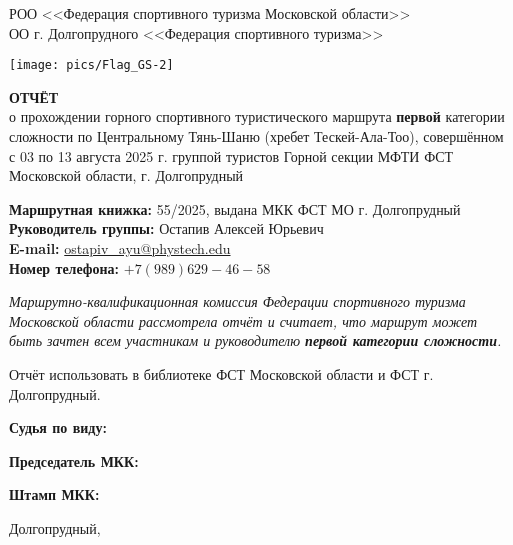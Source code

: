 \begin{titlepage}
\setlength\parindent{0pt}
	\begin{center}
		\large{РОО <<Федерация спортивного туризма Московской области>>\\
		ОО г. Долгопрудного <<Федерация спортивного туризма>>\\}
	\end{center}

	


	
	\begin{center}
		\texttt{[image: pics/Flag\_GS-2]}
		
		\Large{\bfseries{ОТЧЁТ}} \\
		\normalsize о прохождении горного спортивного туристического маршрута \textbf{первой} категории сложности по Центральному Тянь-Шаню (хребет Тескей-Ала-Тоо), совершённом с 03 по 13 августа 2025 г. группой туристов Горной секции МФТИ ФСТ Московской области, г. Долгопрудный
	\end{center}
	\vspace{1.5 cm}
	
	\textbf{Маршрутная книжка:} 55/2025, выдана МКК ФСТ МО г. Долгопрудный \\ 
	\textbf{Руководитель группы:} Остапив Алексей Юрьевич\\
	\textbf{E-mail:} \href{mailto: ostapiv\_ayu@phystech.edu}{ostapiv\_ayu@phystech.edu}\\
	\textbf{Номер телефона:} $+7(989)629-46-58$
	
	\vspace{0.2cm}
	
	\textit{Маршрутно-квалификационная комиссия Федерации спортивного туризма Московской области рассмотрела отчёт и считает, что маршрут может быть зачтен всем участникам и руководителю \textbf{первой категории сложности}.}

	\vspace{0.2cm}
	
	Отчёт использовать в библиотеке ФСТ Московской области и ФСТ г. Долгопрудный.
	
	\vspace{0.8cm}
	\textbf{Судья по виду:} 
	
	
	\vspace{0.8cm}
	\textbf{Председатель МКК:}
	
	\vspace{0.8cm}
	\textbf{Штамп МКК:}
	
	\vfill
	\begin{center}
		Долгопрудный,   \the\year{}
	\end{center}
\end{titlepage}